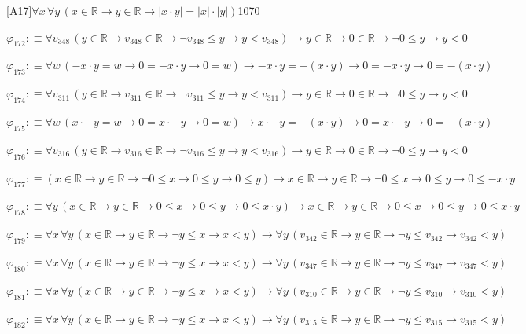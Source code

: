 \begin{fullproof}{[A17]}{$\forall x\,\forall y\,(x \in \mathbb{R} \to y \in \mathbb{R} \to \lvert x \cdot y \rvert = \lvert x \rvert \cdot \lvert y \rvert)$}{1070}
\begin{abbrevlist}
\item $\varphi_{172} :\equiv \forall v_{348}\,(y \in \mathbb{R} \to v_{348} \in \mathbb{R} \to \neg v_{348} \leq y \to y < v_{348}) \to y \in \mathbb{R} \to 0 \in \mathbb{R} \to \neg 0 \leq y \to y < 0$
\item $\varphi_{173} :\equiv \forall w\,(-x \cdot y = w \to 0 = -x \cdot y \to 0 = w) \to -x \cdot y = -(x \cdot y) \to 0 = -x \cdot y \to 0 = -(x \cdot y)$
\item $\varphi_{174} :\equiv \forall v_{311}\,(y \in \mathbb{R} \to v_{311} \in \mathbb{R} \to \neg v_{311} \leq y \to y < v_{311}) \to y \in \mathbb{R} \to 0 \in \mathbb{R} \to \neg 0 \leq y \to y < 0$
\item $\varphi_{175} :\equiv \forall w\,(x \cdot -y = w \to 0 = x \cdot -y \to 0 = w) \to x \cdot -y = -(x \cdot y) \to 0 = x \cdot -y \to 0 = -(x \cdot y)$
\item $\varphi_{176} :\equiv \forall v_{316}\,(y \in \mathbb{R} \to v_{316} \in \mathbb{R} \to \neg v_{316} \leq y \to y < v_{316}) \to y \in \mathbb{R} \to 0 \in \mathbb{R} \to \neg 0 \leq y \to y < 0$
\item $\varphi_{177} :\equiv (x \in \mathbb{R} \to y \in \mathbb{R} \to \neg 0 \leq x \to 0 \leq y \to 0 \leq y) \to x \in \mathbb{R} \to y \in \mathbb{R} \to \neg 0 \leq x \to 0 \leq y \to 0 \leq -x \cdot y$
\item $\varphi_{178} :\equiv \forall y\,(x \in \mathbb{R} \to y \in \mathbb{R} \to 0 \leq x \to 0 \leq y \to 0 \leq x \cdot y) \to x \in \mathbb{R} \to y \in \mathbb{R} \to 0 \leq x \to 0 \leq y \to 0 \leq x \cdot y$
\item $\varphi_{179} :\equiv \forall x\,\forall y\,(x \in \mathbb{R} \to y \in \mathbb{R} \to \neg y \leq x \to x < y) \to \forall y\,(v_{342} \in \mathbb{R} \to y \in \mathbb{R} \to \neg y \leq v_{342} \to v_{342} < y)$
\item $\varphi_{180} :\equiv \forall x\,\forall y\,(x \in \mathbb{R} \to y \in \mathbb{R} \to \neg y \leq x \to x < y) \to \forall y\,(v_{347} \in \mathbb{R} \to y \in \mathbb{R} \to \neg y \leq v_{347} \to v_{347} < y)$
\item $\varphi_{181} :\equiv \forall x\,\forall y\,(x \in \mathbb{R} \to y \in \mathbb{R} \to \neg y \leq x \to x < y) \to \forall y\,(v_{310} \in \mathbb{R} \to y \in \mathbb{R} \to \neg y \leq v_{310} \to v_{310} < y)$
\item $\varphi_{182} :\equiv \forall x\,\forall y\,(x \in \mathbb{R} \to y \in \mathbb{R} \to \neg y \leq x \to x < y) \to \forall y\,(v_{315} \in \mathbb{R} \to y \in \mathbb{R} \to \neg y \leq v_{315} \to v_{315} < y)$

\end{abbrevlist}
\end{fullproof}
